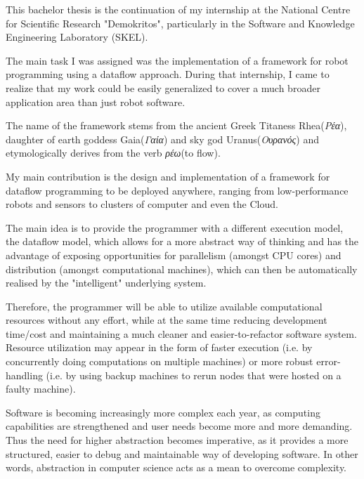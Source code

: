 \documentclass{dithesis}
\begin{document}
\tableofcontents
\listoffigures

\begin{thesisprologue}[Prologue]

This bachelor thesis is the continuation of my internship at the National Centre for Scientific Research "Demokritos", particularly in the Software and Knowledge Engineering Laboratory (SKEL). 

The main task I was assigned was the implementation of a framework for robot programming using a dataflow approach. During that internship, I came to realize that my work could be easily generalized to cover a much broader application area than just robot software. 

The name of the framework stems from the ancient Greek Titaness Rhea(\textit{Ρέα}), daughter of earth goddess Gaia(\textit{Γαία}) and sky god Uranus(\textit{Ουρανός}) and etymologically derives from the verb \textit{ρέω}(to flow).

\end{thesisprologue}



My main contribution is the design and implementation of a framework for dataflow programming to be deployed anywhere, ranging from low-performance robots and sensors to clusters of computer and even the Cloud. 

The main idea is to provide the programmer with a different execution model, the dataflow model, which allows for a more abstract way of thinking and has the advantage of exposing opportunities for parallelism (amongst CPU cores) and distribution (amongst computational machines), which can then be automatically realised by the "intelligent" underlying system. 

Therefore, the programmer will be able to utilize available computational resources without any effort, while at the same time reducing development time/cost and maintaining a much cleaner and easier-to-refactor software system. Resource utilization may appear in the form of faster execution (i.e. by concurrently doing computations on multiple machines) or more robust error-handling (i.e. by using backup machines to rerun nodes that were hosted on a faulty machine). 



Software is becoming increasingly more complex each year, as computing capabilities are strengthened and user needs become more and more demanding. Thus the need for higher abstraction becomes imperative, as it provides a more structured, easier to debug and maintainable way of developing software. In other words, abstraction in computer science acts as a mean to overcome complexity. 
\end{document}

